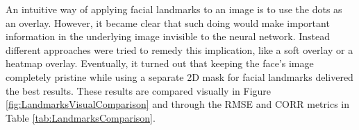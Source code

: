 \noindent An intuitive way of applying facial landmarks to an image is to use the dots as an overlay. However, it became clear that such doing would make important information in the underlying image invisible to the neural network. Instead different approaches were tried to remedy this implication, like a soft overlay or a heatmap overlay. Eventually, it turned out that keeping the face's image completely pristine while using a separate 2D mask for facial landmarks delivered the best results. These results are compared visually in Figure \ref{fig:LandmarksVisualComparison} and through the RMSE and CORR metrics in Table \ref{tab:LandmarksComparison}.\newline

\begin{figure}[htbp]
  \begin{center}
  \hfill
  \hfill

\end{center}
\end{figure}
